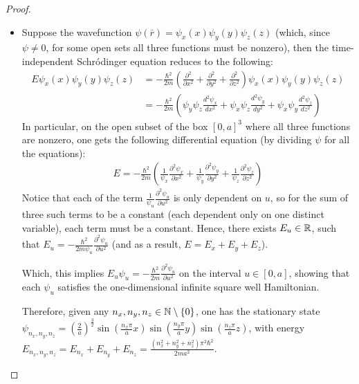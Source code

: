 \documentclass{article}
\begin{document}
\begin{proof}

    \hfil

    \begin{itemize}
        \item[(a)]Suppose the wavefunction $\psi(\bar{r}) = \psi_x(x)\psi_y(y)\psi_z(z)$ (which, since $\psi\neq 0$, for some open sets all three functions must be nonzero), then the time-independent Schr\'odinger equation reduces to the following:
    \begin{align}
        E\psi_x(x)\psi_y(y)\psi_z(z) &= -\frac{\hbar^2}{2m}\left(\frac{\partial^2}{\partial x^2} + \frac{\partial^2}{\partial y^2} + \frac{\partial^2}{\partial z^2}\right)\psi_x(x)\psi_y(y)\psi_z(z)\\
        &= -\frac{\hbar^2}{2m}\left(\psi_y\psi_z\frac{d^2\psi_x}{dx^2}+\psi_x\psi_z\frac{d^2\psi_y}{dy^2}+\psi_x\psi_y\frac{d^2\psi_z}{dz^2}\right)
    \end{align}
    In particular, on the open subset of the box $[0,a]^3$ where all three functions are nonzero, one gets the following differential equation (by dividing $\psi$ for all the equations):
    \begin{align}
        E =-\frac{\hbar^2}{2m}\left(\frac{1}{\psi_x}\frac{\partial^2\psi_x}{\partial x^2}+\frac{1}{\psi_y}\frac{\partial^2\psi_y}{\partial y^2}+\frac{1}{\psi_z}\frac{\partial^2\psi_z}{\partial z^2}\right)
    \end{align}
    Notice that each of the term $\frac{1}{\psi_u}\frac{\partial^2\psi_u}{\partial u^2}$ is only dependent on $u$, so for the sum of three such terms to be a constant (each dependent only on one distinct variable), each term must be a constant. Hence, there exists $E_u\in\mathbb{R}$, such that $E_u = -\frac{\hbar^2}{2m\psi_u}\frac{\partial^2\psi_u}{\partial u^2}$ (and as a result, $E=E_x+E_y+E_z$).

    Which, this implies $E_u \psi_u=-\frac{\hbar^2}{2m}\frac{\partial^2\psi_u}{\partial u^2}$ on the interval $u\in [0,a]$, showing that each $\psi_u$ satisfies the one-dimensional infinite square well Hamiltonian. 
    
    Therefore, given any $n_x,n_y,n_z\in\mathbb{N}\setminus\{0\}$, one has the stationary state $\psi_{n_x,n_y,n_z} = \left(\frac{2}{a}\right)^\frac{3}{2}\sin\left(\frac{n_x \pi}{a}x\right)\sin\left(\frac{n_y \pi}{a}y\right)\sin\left(\frac{n_z \pi}{a}z\right)$, with energy $E_{n_x,n_y,n_z} = E_{n_x}+E_{n_y}+E_{n_z} = \frac{(n_x^2+n_y^2+n_z^2)\pi^2\hbar^2}{2ma^2}$.


\end{itemize}
\end{proof}
\end{document}
